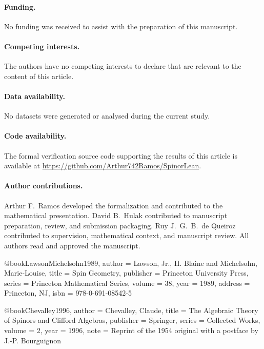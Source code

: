 \documentclass{birkjour}
\theoremstyle{plain}
\theoremstyle{definition}
\theoremstyle{remark}
\begin{document}
\paragraph{Funding.}
No funding was received to assist with the preparation of this manuscript.

\paragraph{Competing interests.}
The authors have no competing interests to declare that are relevant to the
content of this article.

\paragraph{Data availability.}
No datasets were generated or analysed during the current study.

\paragraph{Code availability.}
The formal verification source code supporting the results of this article is
available at \url{https://github.com/Arthur742Ramos/SpinorLean}.

\paragraph{Author contributions.}
Arthur F.~Ramos developed the formalization and contributed to the mathematical
presentation. David B.~Hulak contributed to manuscript preparation, review, and
submission packaging. Ruy J.~G.~B.~de Queiroz contributed to supervision,
mathematical context, and manuscript review. All authors read and approved the
manuscript.


@book{LawsonMichelsohn1989,
  author    = {Lawson, Jr., H. Blaine and Michelsohn, Marie-Louise},
  title     = {Spin Geometry},
  publisher = {Princeton University Press},
  series    = {Princeton Mathematical Series},
  volume    = {38},
  year      = {1989},
  address   = {Princeton, NJ},
  isbn      = {978-0-691-08542-5}
}

@book{Chevalley1996,
  author    = {Chevalley, Claude},
  title     = {The Algebraic Theory of Spinors and Clifford Algebras},
  publisher = {Springer},
  series    = {Collected Works},
  volume    = {2},
  year      = {1996},
  note      = {Reprint of the 1954 original with a postface by J.-P. Bourguignon}
}
\end{document}
